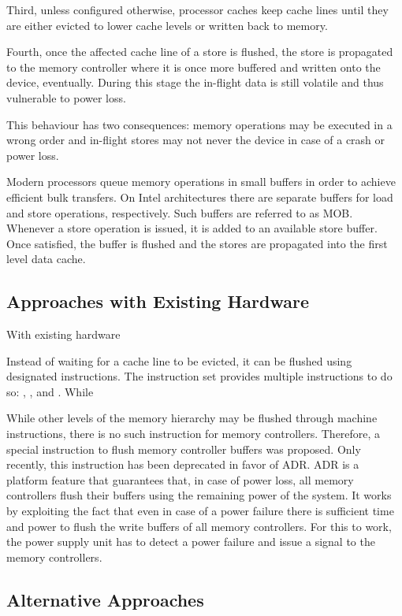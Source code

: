 Third, unless configured otherwise, processor caches keep cache lines until they
are either evicted to lower cache levels or written back to memory.

Fourth, once the affected cache line of a store is flushed, the store is
propagated to the memory controller where it is once more buffered and written
onto the device, eventually. During this stage the in-flight data is still
volatile and thus vulnerable to power loss.

This behaviour has two consequences: memory operations may be executed in a
wrong order and in-flight stores may not never the device in case of a crash
or power loss.

Modern processors queue memory operations in small buffers in order to achieve
efficient bulk transfers. On Intel  architectures there are separate
buffers for load and store operations, respectively. Such buffers are referred
to as MOB. Whenever a store operation is issued, it is added to an
available store buffer. Once satisfied, the buffer is flushed and the stores are
propagated into the first level data cache.

\subsection{Approaches with Existing Hardware}

With existing hardware


Instead of waiting for a cache line to be evicted, it can be flushed using
designated instructions. The  instruction set provides multiple
instructions to do so: , , and .
While 


While other levels of the memory hierarchy may be flushed through machine
instructions, there is no such instruction for memory controllers. Therefore,
 a special instruction to flush memory controller buffers was
proposed. Only recently, this instruction has been deprecated in favor of
ADR. ADR is a platform feature that guarantees that, in case of power
loss, all memory controllers flush their buffers using the remaining power of
the system. It works by exploiting the fact that even in case of a power failure
there is sufficient time and power to flush the write buffers of all memory
controllers. For this to work, the power supply unit has to detect a power
failure and issue a signal to the memory controllers.

\subsection{Alternative Approaches}

